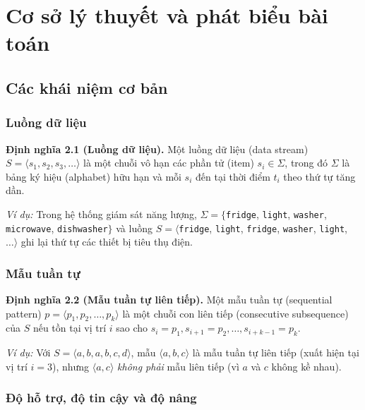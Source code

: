 \documentclass[14pt,a4paper,oneside]{extreport}
\begin{document}
\chapter{Cơ sở lý thuyết và phát biểu bài toán}
\label{chap:theory}

\section{Các khái niệm cơ bản}

\subsection{Luồng dữ liệu}
\textbf{Định nghĩa 2.1 (Luồng dữ liệu).} Một luồng dữ liệu (data stream) $S = \langle s_1, s_2, s_3, \dots \rangle$ là một chuỗi vô hạn các phần tử (item) $s_i \in \Sigma$, trong đó $\Sigma$ là bảng ký hiệu (alphabet) hữu hạn và mỗi $s_i$ đến tại thời điểm $t_i$ theo thứ tự tăng dần.

\textit{Ví dụ:} Trong hệ thống giám sát năng lượng, $\Sigma = \{$\texttt{fridge}, \texttt{light}, \texttt{washer}, \texttt{microwave}, \texttt{dishwasher}$\}$ và luồng $S = \langle$\texttt{fridge}, \texttt{light}, \texttt{fridge}, \texttt{washer}, \texttt{light}, $\dots\rangle$ ghi lại thứ tự các thiết bị tiêu thụ điện.

\subsection{Mẫu tuần tự}
\textbf{Định nghĩa 2.2 (Mẫu tuần tự liên tiếp).} Một mẫu tuần tự (sequential pattern) $p = \langle p_1, p_2, \dots, p_k \rangle$ là một chuỗi con liên tiếp (consecutive subsequence) của $S$ nếu tồn tại vị trí $i$ sao cho $s_i = p_1, s_{i+1} = p_2, \dots, s_{i+k-1} = p_k$.

\textit{Ví dụ:} Với $S = \langle a, b, a, b, c, d \rangle$, mẫu $\langle a, b, c \rangle$ là mẫu tuần tự liên tiếp (xuất hiện tại vị trí $i = 3$), nhưng $\langle a, c \rangle$ \textit{không phải} mẫu liên tiếp (vì $a$ và $c$ không kề nhau).

\subsection{Độ hỗ trợ, độ tin cậy và độ nâng}
\end{document}
